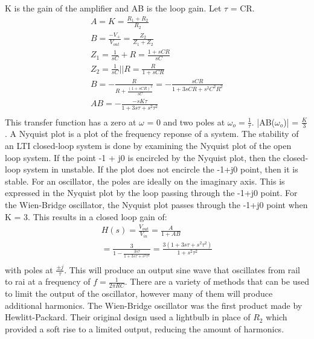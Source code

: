 \documentclass{article}
\begin{document}
K is the gain of the amplifier and AB is the loop gain. 	Let $\tau$ = CR.
\begin {gather*}
	A = K = \frac{R_1 + R_2}{R_2}\\
	B = \frac{-V_+}{V_{out}} = \frac{Z_2}{Z_1 + Z_2}\\
	Z_1 = \frac{1}{sC} + R = \frac{1 + sCR}{sC}\\
	Z_2 = \frac{1}{sC}||R = \frac{R}{1+sCR}\\
	B = -\frac{R}{R+\frac{{(1+sCR)}^2}{sC}} = -\frac{sCR}{1+3sCR+s^2C^2R^2}\\
	AB = -\frac{-sK\tau}{1+3s\tau+s^2{\tau}^2}\\
\end {gather*}
This transfer function has a zero at $\omega$ = 0 and two poles at ${\omega}_o = \frac{1}{\tau}$. |AB(${\omega}_o$)| = $\frac{K}{3}$. A Nyquist plot is a plot of the frequency reponse of a system. The stability of an LTI closed-loop system is done by examining the Nyquist plot of the open loop system. If the point -1 + j0 is encircled by the Nyquist plot, then the closed-loop system in unstable. If the plot does not encircle the -1+j0 point, then it is stable. For an oscillator, the poles are ideally on the imaginary axis. This is expressed in the Nyquist plot by the loop passing through the -1+j0 point. For the Wien-Bridge oscillator, the Nyquist plot passes through the -1+j0 point when K = 3. This results in a closed loop gain of:
\begin {gather*}
	H(s) = \frac{V_{out}}{V_{in}} = \frac{A}{1 + AB}\\
	= \frac{3}{1-\frac{3s\tau}{1+3s\tau+s^2{\tau}^2}} = \frac{3(1+3s\tau+s^2{\tau}^2)}{1+s^2{\tau}^2}\\
\end {gather*}
with poles at $\frac{{\pm}j}{\tau}$. This will produce an output sine wave that oscillates from rail to rai at a frequency of $f = \frac{1}{2{\pi}RC}$. There are a variety of methods that can be used to limit the output of the oscillator, however many of them will produce additional harmonics. The Wien-Bridge oscillator was the first product made by Hewlitt-Packard. Their original design used a lightbulb in place of $R_2$ which provided a soft rise to a limited output, reducing the amount of harmonics.
\end{document}
